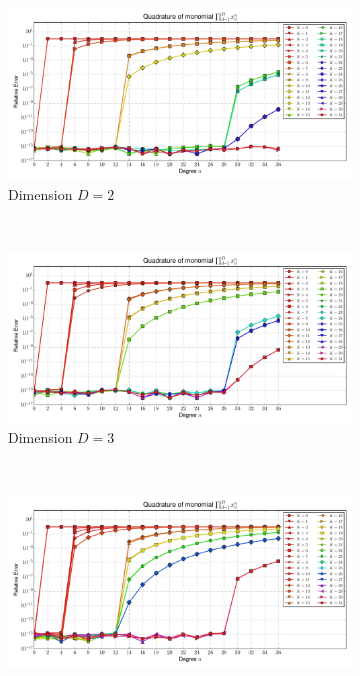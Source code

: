\documentclass[a4paper,10pt]{article}
\begin{document}
\begin{figure}
  \begin{subfigure}[b]{\linewidth}
    \centering
    \includegraphics[width=\linewidth]{./img/monomial_errors_chebyshevu_multivariate_dimension_2.pdf}
    \caption{Dimension $D=2$}
    \label{fig:monomial_errors_chebyshevu_multivariate_dimension_2}
  \end{subfigure} \\
  \begin{subfigure}[b]{\linewidth}
    \centering
    \includegraphics[width=\linewidth]{./img/monomial_errors_chebyshevu_multivariate_dimension_3.pdf}
    \caption{Dimension $D=3$}
    \label{fig:monomial_errors_chebyshevu_multivariate_dimension_3}
  \end{subfigure} \\
  \begin{subfigure}[b]{\linewidth}
    \centering
    \includegraphics[width=\linewidth]{./img/monomial_errors_chebyshevu_multivariate_dimension_4.pdf}

\end{subfigure}
\end{figure}
\end{document}
